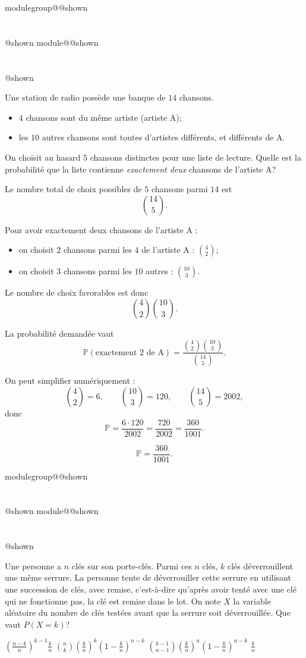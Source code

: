 \documentclass{Evaluation}
\makeatletter
\newcommand{\currentmodulekey}{}
\newcommand{\currentmoduletitle}{}
\newcommand{\currentgroupkey}{}
\newcommand{\currentgrouptitle}{}
\newcommand{\showmoduleifneeded}{%
  \ifx\currentgroupkey\empty\else
    \expandafter\ifx\csname modulegroup@\currentgroupkey @shown\endcsname\relax
      \section*{\currentgrouptitle}%
      \expandafter\gdef\csname modulegroup@\currentgroupkey @shown\endcsname{1}%
    \fi
  \fi
  \expandafter\ifx\csname module@\currentmodulekey @shown\endcsname\relax
    \section*{\currentmoduletitle}%
    \expandafter\gdef\csname module@\currentmodulekey @shown\endcsname{1}%
  \fi
}
\newenvironment{A23}{\showmoduleifneeded}{}
\newenvironment{H26}{\showmoduleifneeded}{}
\makeatother
\begin{document}
\begin{questions}
\begin{H26}
Une station de radio possède une banque de \(14\) chansons.
\begin{itemize}
\item \(4\) chansons sont du même artiste (artiste A);
\item les \(10\) autres chansons sont toutes d’artistes différents, et différents de A.
\end{itemize}

On choisit au hasard \(5\) chansons distinctes pour une liste de lecture. Quelle est la probabilité que la liste contienne \emph{exactement deux} chansons de l’artiste A?

\begin{solution}
Le nombre total de choix possibles de \(5\) chansons parmi \(14\) est
\[
\binom{14}{5}.
\]

Pour avoir exactement deux chansons de l’artiste A :
\begin{itemize}
\item on choisit \(2\) chansons parmi les \(4\) de l’artiste A : \(\binom{4}{2}\);
\item on choisit \(3\) chansons parmi les \(10\) autres : \(\binom{10}{3}\).
\end{itemize}

Le nombre de choix favorables est donc
\[
\binom{4}{2}\binom{10}{3}.
\]

La probabilité demandée vaut
\[
\mathbb{P}(\text{exactement 2 de A})
=
\frac{\binom{4}{2}\binom{10}{3}}{\binom{14}{5}}.
\]

On peut simplifier numériquement :
\[
\binom{4}{2}=6,\qquad \binom{10}{3}=120,\qquad \binom{14}{5}=2002,
\]
donc
\[
\mathbb{P}=\frac{6\cdot 120}{2002}=\frac{720}{2002}=\frac{360}{1001}.
\]

\[
\boxed{\mathbb{P}=\frac{360}{1001}.}
\]
\end{solution}
\end{H26}

\begin{A23}
\question {} %
Une personne a $n$ clés sur son porte-clés.
Parmi ces $n$ clés, $k$ clés déverrouillent une même serrure. 
La personne tente de déverrouiller cette serrure en utilisant une succession de clés, avec remise, c'est-à-dire qu'après avoir tenté avec une clé qui ne fonctionne pas, la clé est remise dans le lot.
On note $X$ la variable aléatoire du nombre de clés testées avant que la serrure soit déverrouillée.
Que vaut $P(X=k)$?

\begin{oneparcheckboxes}
    \choice $\displaystyle \left(\frac{n-k}{n}\right)^{k-1}\frac{k}{n}$
    \choice $\displaystyle \binom{n}{k}\left(\frac{k}{n}\right)^{k}\left(1-\frac{k}{n}\right)^{n-k}$
    \correctchoice $\displaystyle \binom{k-1}{n-1}\left(\frac{k}{n}\right)^{n}\left(1-\frac{k}{n}\right)^{n-k}$
    \choice $\displaystyle \frac{k}{n}$
\end{oneparcheckboxes}
\end{A23}


\end{questions}
\end{document}
